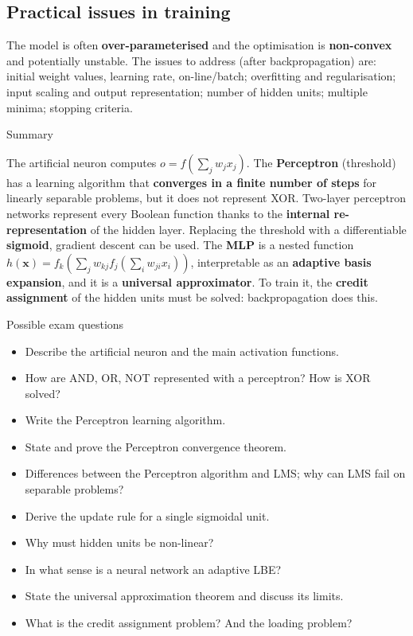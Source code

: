 \subsection{Practical issues in
training}\label{questioni-pratiche-nelladdestramento}

The model is often \textbf{over-parameterised} and the optimisation is
\textbf{non-convex} and potentially unstable. The issues to address
(after backpropagation) are: initial weight values, learning rate,
on-line/batch; overfitting and regularisation; input scaling and output
representation; number of hidden units; multiple minima; stopping
criteria.

\begin{boxabstract}{Summary}

The artificial neuron computes \(o = f(\sum_j w_j x_j)\). The
\textbf{Perceptron} (threshold) has a learning algorithm that
\textbf{converges in a finite number of steps} for linearly separable
problems, but it does not represent XOR. Two-layer perceptron networks
represent every Boolean function thanks to the \textbf{internal
re-representation} of the hidden layer. Replacing the threshold with a
differentiable \textbf{sigmoid}, gradient descent can be used. The
\textbf{MLP} is a nested function
\(h(\mathbf{x}) = f_k(\sum_j w_{kj} f_j(\sum_i w_{ji} x_i))\),
interpretable as an \textbf{adaptive basis expansion}, and it is a
\textbf{universal approximator}. To train it, the \textbf{credit
assignment} of the hidden units must be solved: backpropagation does
this.

\end{boxabstract}

\begin{boxquestion}{Possible exam questions}

\begin{itemize}
\tightlist
\item
  Describe the artificial neuron and the main activation functions.
\item
  How are AND, OR, NOT represented with a perceptron? How is XOR
  solved?
\item
  Write the Perceptron learning algorithm.
\item
  State and prove the Perceptron convergence theorem.
\item
  Differences between the Perceptron algorithm and LMS; why can LMS
  fail on separable problems?
\item
  Derive the update rule for a single sigmoidal unit.
\item
  Why must hidden units be non-linear?
\item
  In what sense is a neural network an adaptive LBE?
\item
  State the universal approximation theorem and discuss its limits.
\item
  What is the credit assignment problem? And the loading problem?
\end{itemize}

\end{boxquestion}
